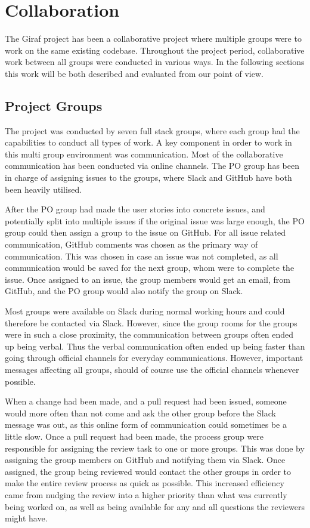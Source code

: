 \chapter{Collaboration}
The Giraf project has been a collaborative project where multiple groups were to work on the same existing codebase.
Throughout the project period, collaborative work between all groups were conducted in various ways.  
In the following sections this work will be both described and evaluated from our point of view.

\section{Project Groups}
The project was conducted by seven full stack groups, where each group had the capabilities to conduct all types of work.
A key component in order to work in this multi group environment was communication.
Most of the collaborative communication has been conducted via online channels.
The PO group has been in charge of assigning issues to the groups, where Slack and GitHub have both been heavily utilised.

After the PO group had made the user stories into concrete issues, and potentially split into multiple issues if the original issue was large enough, the PO group could then assign a group to the issue on GitHub.
For all issue related communication, GitHub comments was chosen as the primary way of communication. 
This was chosen in case an issue was not completed, as all communication would be saved for the next group, whom were to complete the issue.
Once assigned to an issue, the group members would get an email, from GitHub, and the PO group would also notify the group on Slack. 

Most groups were available on Slack during normal working hours and could therefore be contacted via Slack.
However, since the group rooms for the groups were in such a close proximity, the communication between groups often ended up being verbal.
Thus the verbal communication often ended up being faster than going through official channels for everyday communications.
However, important messages affecting all groups, should of course use the official channels whenever possible.

When a change had been made, and a pull request had been issued, someone would more often than not come and ask the other group before the Slack message was out, as this online form of communication could sometimes be a little slow.
Once a pull request had been made, the process group were responsible for assigning the review task to one or more groups. 
This was done by assigning the group members on GitHub and notifying them via Slack. 
Once assigned, the group being reviewed would contact the other groups in order to make the entire review process as quick as possible.
This increased efficiency came from nudging the review into a higher priority than what was currently being worked on, as well as being available for any and all questions the reviewers might have.

